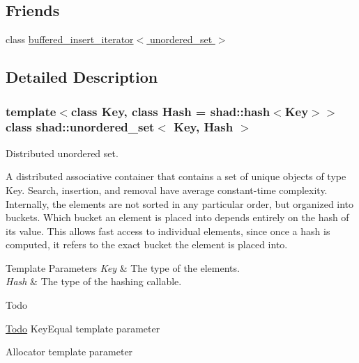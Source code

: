 \subsection*{Friends}
\begin{DoxyCompactItemize}
\item 
class \hyperlink{classshad_1_1unordered__set_a37f994eeafee71345ca4e4e8cd1435e8}{buffered\-\_\-insert\-\_\-iterator$<$ unordered\-\_\-set $>$}
\end{DoxyCompactItemize}


\subsection{Detailed Description}
\subsubsection*{template$<$class Key, class Hash = shad\-::hash$<$\-Key$>$$>$class shad\-::unordered\-\_\-set$<$ Key, Hash $>$}

Distributed unordered set. 

A distributed associative container that contains a set of unique objects of type Key. Search, insertion, and removal have average constant-\/time complexity. Internally, the elements are not sorted in any particular order, but organized into buckets. Which bucket an element is placed into depends entirely on the hash of its value. This allows fast access to individual elements, since once a hash is computed, it refers to the exact bucket the element is placed into.


\begin{DoxyTemplParams}{Template Parameters}
{\em Key} & The type of the elements. \\
\hline
{\em Hash} & The type of the hashing callable.\\
\hline
\end{DoxyTemplParams}
\begin{DoxyRefDesc}{Todo}
\item[\hyperlink{todo__todo000003}{Todo}]Key\-Equal template parameter 

Allocator template parameter \end{DoxyRefDesc}


